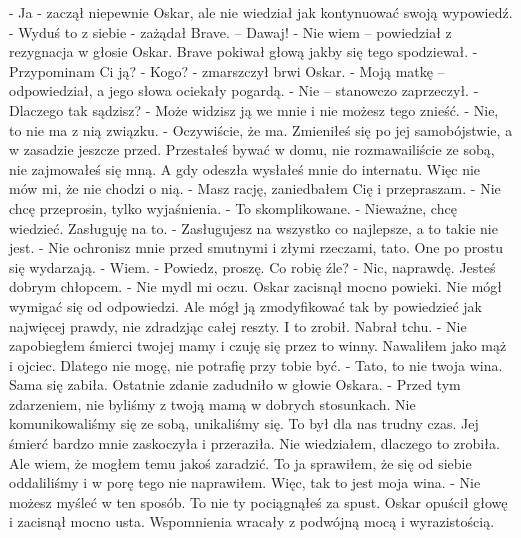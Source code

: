 \documentclass[12pt,a4paper]{book}
\begin{document}
- Ja - zaczął niepewnie Oskar, ale nie wiedział jak kontynuować swoją wypowiedź. 
- Wyduś to z siebie - zażądał Brave. – Dawaj!
- Nie wiem – powiedział z rezygnacja w głosie Oskar. 
Brave pokiwał głową jakby się tego spodziewał. 
- Przypominam Ci ją?
- Kogo? - zmarszczył brwi Oskar. 
- Moją matkę – odpowiedział, a jego słowa ociekały pogardą. 
- Nie – stanowczo zaprzeczył. - Dlaczego tak sądzisz?
- Może widzisz ją we mnie i nie możesz tego znieść. 
- Nie, to nie ma z nią związku. 
- Oczywiście, że ma. Zmieniłeś się po jej samobójstwie, a w zasadzie jeszcze przed. Przestałeś bywać w domu, nie rozmawailiście ze sobą, nie zajmowałeś się mną. A gdy odeszła wysłałeś mnie do internatu. Więc nie mów mi, że nie chodzi o nią. 
- Masz rację, zaniedbałem Cię i przepraszam. 
- Nie chcę przeprosin, tylko wyjaśnienia. 
- To skomplikowane.
- Nieważne, chcę wiedzieć. Zasługuję na to. 
- Zasługujesz na wszystko co najlepsze, a to takie nie jest. 
- Nie ochronisz mnie przed smutnymi i złymi rzeczami, tato. One po prostu się wydarzają. 
- Wiem. 
- Powiedz, proszę. Co robię źle?
- Nic, naprawdę. Jesteś dobrym chłopcem. 
- Nie mydl mi oczu. 
Oskar zacisnął mocno powieki. Nie mógł wymigać się od odpowiedzi. Ale mógł ją zmodyfikować tak by powiedzieć jak najwięcej prawdy, nie zdradzjąc całej reszty. I to zrobił. Nabrał tchu.
- Nie zapobiegłem śmierci twojej mamy i czuję się przez to winny. Nawaliłem jako mąż i ojciec. Dlatego nie mogę, nie potrafię przy tobie być.
- Tato, to nie twoja wina. Sama się zabiła. 
Ostatnie zdanie zadudniło w głowie Oskara. 
- Przed tym zdarzeniem, nie byliśmy z twoją mamą w dobrych stosunkach. Nie komunikowaliśmy się ze sobą, unikaliśmy się. To był dla nas trudny czas. Jej śmierć bardzo mnie zaskoczyła i przeraziła. Nie wiedziałem, dlaczego to zrobiła. Ale wiem, że mogłem temu jakoś zaradzić. To ja sprawiłem, że się od siebie oddaliliśmy i w porę tego nie naprawiłem. Więc, tak to jest moja wina. 
- Nie możesz myśleć w ten sposób. To nie ty pociągnąłeś za spust. 
Oskar opuścił głowę i zacisnął mocno usta. Wspomnienia wracały z podwójną mocą i wyrazistością. 
\end{document}
